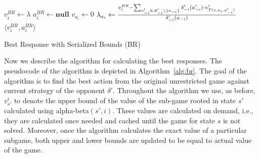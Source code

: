 \begin{algorithm2e}[t]
\small
{}
$v^{BR}_i \leftarrow \lambda$ \;
$a_i^{BR} \leftarrow \textbf{null}$ \;
 {%
	$v_{a_i} \leftarrow 0$\;
	 {\label{alg:br:opp}
		$\lambda_{a_i} \leftarrow \frac{v_i^{BR} - \sum_{a'_{-i} \in \mathcal{A}'_{-i} \setminus \lbrace a_{-i} \rbrace} \delta'_{-i}(a'_{-i}) \cdot v^i_{\mathcal{T}(s,a_i,a'_{-i})}}{\delta'_{-i}(a_{-i})}$\; \label{alg:br:bound}
	}
}
\Return $\langle v_i^{BR}, a_i^{BR} \rangle$ 
\caption{Best Response with Serialized Bounds (BR)}\label{alg:br}
\end{algorithm2e}

Now we describe the algorithm for calculating the best responses. 
The pseudocode of the algorithm is depicted in Algorithm~\ref{alg:br}.
The goal of the algorithm is to find the best action from the original unrestricted game against current strategy of the opponent $\delta'$. 
Throughout the algorithm we use, as before, $v^i_{s'}$ to denote the upper bound of the value of the sub-game rooted in state $s'$ calculated using alpha-beta$(s',i)$. These values are calculated on demand, i.e., they are calculated once needed and cached until the game for state $s$ is not solved.
Moreover, once the algorithm calculates the exact value of a particular subgame, both upper and lower bounds are updated to be equal to actual value of the game. 

